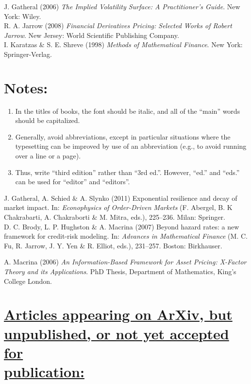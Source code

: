 \documentclass{ws-ijtaf}
\begin{document}
\noindent J. Gatheral (2006) {\it The Implied Volatility Surface: A Practitioner's Guide}. New York: Wiley.\\[3pt]

\noindent R. A. Jarrow (2008) {\it Financial Derivatives Pricing: Selected Works of Robert Jarrow}. New
Jersey: World Scientific Publishing Company.\\[3pt]

\noindent I. Karatzas \& S. E. Shreve (1998) {\it Methods of Mathematical Finance}. New York: Springer-Verlag.

\section*{Notes:}
\begin{enumerate}[4.]
\item[1.] In the titles of books, the font should be italic, and all of the ``main'' words should be capitalized.

\item[2.] Generally, avoid abbreviations, except in particular situations where the typesetting can be improved by use of an abbreviation (e.g., to avoid running over a line or a page).

\item[3.] Thus, write ``third edition'' rather than ``3rd ed.''. However, ``ed.'' and ``eds.'' can be used for
``editor'' and ``editors''.
\end{enumerate}


\noindent J. Gatheral, A. Schied \& A. Slynko (2011) Exponential resilience and decay of market impact. In: {\it Econophysics of Order-Driven Markets} (F. Abergel, B. K Chakrabarti, A. Chakraborti \& M. Mitra, eds.), 225--236. Milan: Springer.\\[3pt]

\noindent D. C. Brody, L. P. Hughston \& A. Macrina (2007) Beyond hazard rates: a new framework for credit-risk modeling. In: {\it Advances in Mathematical Finance} (M. C. Fu, R. Jarrow, J. Y. Yen \& R. Elliot, eds.), 231--257. Boston: Birkhauser.


\noindent A. Macrina (2006) {\it An Information-Based Framework for Asset Pricing: X-Factor Theory and its Applications}. PhD Thesis, Department of Mathematics, King's College London.

\section*{\underline{Articles appearing on ArXiv, but unpublished, or not yet accepted for}\\ \underline{publication:}}
\end{document}
